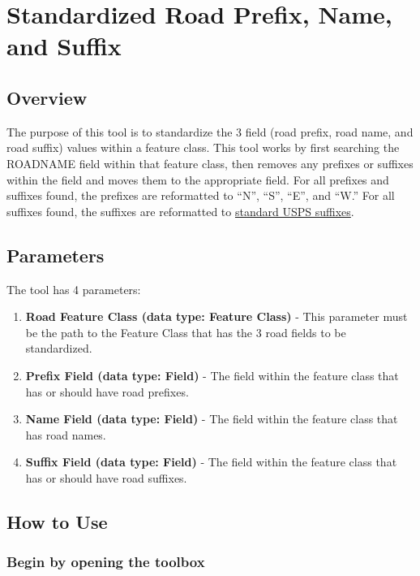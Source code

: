 \documentclass[openany]{book}
\providecommand{\tightlist}{%
  \setlength{\itemsep}{0pt}\setlength{\parskip}{0pt}}
\theoremstyle{definition}
\theoremstyle{definition}
\theoremstyle{definition}
\theoremstyle{remark}
\begin{document}
\hypertarget{std3}{\chapter{Standardized Road Prefix, Name, and
Suffix}\label{std3}}

\section{Overview}\label{overview-7}

The purpose of this tool is to standardize the 3 field (road prefix,
road name, and road suffix) values within a feature class. This tool
works by first searching the ROADNAME field within that feature class,
then removes any prefixes or suffixes within the field and moves them to
the appropriate field. For all prefixes and suffixes found, the prefixes
are reformatted to ``N'', ``S'', ``E'', and ``W.'' For all suffixes
found, the suffixes are reformatted to
\href{https://github.com/allanbreyes/udacity-data-science/blob/master/p2/data/suffixes.csv}{standard
USPS suffixes}.

\section{Parameters}\label{parameters-7}

The tool has 4 parameters:

\begin{enumerate}
\def\labelenumi{\arabic{enumi}.}
\tightlist
\item
  \textbf{Road Feature Class (data type: Feature Class)} - This
  parameter must be the path to the Feature Class that has the 3 road
  fields to be standardized.
\item
  \textbf{Prefix Field (data type: Field)} - The field within the
  feature class that has or should have road prefixes.
\item
  \textbf{Name Field (data type: Field)} - The field within the feature
  class that has road names.
\item
  \textbf{Suffix Field (data type: Field)} - The field within the
  feature class that has or should have road suffixes.
\end{enumerate}

\section{How to Use}\label{how-to-use-7}

\subsection{Begin by opening the
toolbox}\label{begin-by-opening-the-toolbox-7}
\end{document}
